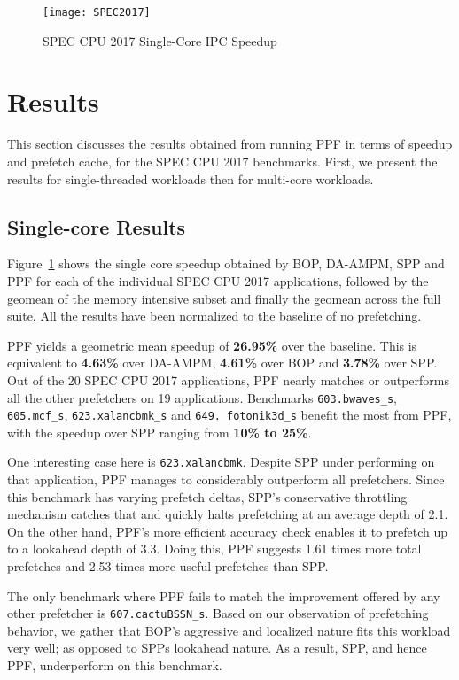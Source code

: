 \begin{figure}[ht]
\texttt{[image: SPEC2017]}
\caption{SPEC CPU 2017 Single-Core IPC Speedup}
\label{Fig:SPEC2017_1core}
\end{figure}

\section{Results}
\label{Results}

This section discusses the results obtained from running PPF in terms
of speedup and prefetch cache, for the SPEC CPU 2017 benchmarks.
First, we present the results for single-threaded workloads then for
multi-core workloads.

\subsection{Single-core Results}
\label{Results-Single}

Figure~\ref{Fig:SPEC2017_1core} shows the single core speedup obtained
by BOP, DA-AMPM, SPP and PPF for each of the individual SPEC CPU 2017
applications, followed by the geomean of the memory intensive subset
and finally the geomean across the full suite.  All the results have
been normalized to the baseline of no prefetching.

PPF yields a geometric mean speedup of \textbf{26.95\%} over the
baseline.  This is equivalent to \textbf{4.63\%} over DA-AMPM,
\textbf{4.61\%} over BOP and \textbf{3.78\%} over SPP.  Out of the 20
SPEC CPU 2017 applications, PPF nearly matches or
outperforms all the other prefetchers on 19 applications.  
Benchmarks {\tt 603.bwaves\_s}, {\tt 605.mcf\_s}, {\tt{623.xalancbmk}\_s} 
and {\tt 649. fotonik3d\_s} benefit the most from PPF, with the 
speedup over SPP ranging from \textbf{10\% to 25\%}.

One interesting
case here is {\tt 623.xalancbmk}.  Despite SPP under performing on that
application, PPF manages to considerably outperform all prefetchers.
Since this benchmark has varying prefetch deltas, SPP's conservative
throttling mechanism catches that and quickly halts prefetching at an
average depth of 2.1.  On the other hand, PPF's more efficient
accuracy check enables it to prefetch up to a lookahead depth of
3.3. Doing this, PPF suggests 1.61 times more total prefetches and
2.53 times more useful prefetches than SPP.

The only benchmark where PPF fails to match the improvement offered by
any other prefetcher is {\tt 607.cactuBSSN\_s}. Based on our observation
of prefetching behavior, we gather that BOP's aggressive and localized
nature fits this workload very well; as opposed to SPPs lookahead
nature.  As a result, SPP, and hence PPF, underperform on this
benchmark.

